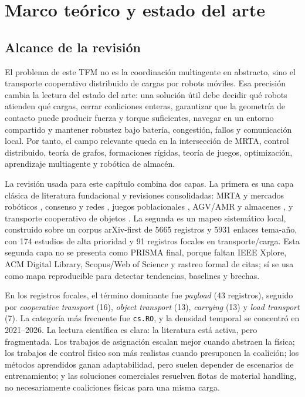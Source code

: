 \section{Marco teórico y estado del arte}

\subsection{Alcance de la revisión}

El problema de este TFM no es la coordinación multiagente en abstracto, sino el
transporte cooperativo distribuido de cargas por robots móviles. Esa precisión cambia la
lectura del estado del arte: una solución útil debe decidir qué robots atienden qué
cargas, cerrar coaliciones enteras, garantizar que la geometría de contacto puede
producir fuerza y torque suficientes, navegar en un entorno compartido y mantener
robustez bajo batería, congestión, fallos y comunicación local. Por tanto, el campo
relevante queda en la intersección de MRTA, control distribuido, teoría de grafos,
formaciones rígidas, teoría de juegos, optimización, aprendizaje multiagente y robótica
de almacén.

La revisión usada para este capítulo combina dos capas. La primera es una capa clásica
de literatura fundacional y revisiones consolidadas: MRTA y mercados robóticos
\citep{gerkey2004formal,dias2006market,korsah2013taxonomy}, consenso y redes
\citep{olfati2004consensus,olfati2007consensus,ren2008distributed,bullo2009distributed},
juegos poblacionales \citep{sandholm2010population,quijano2017population}, AGV/AMR y
almacenes \citep{leanh2006agv,wurman2008coordinating,azadeh2019warehouse}, y transporte
cooperativo de objetos \citep{tuci2018cooperative,farivarnejad2022multirobot,an2023cooperative}.
La segunda es un mapeo sistemático local, construido sobre un corpus arXiv-first de
5665 registros y 5931 enlaces tema-año, con 174 estudios de alta prioridad y 91 registros
focales en transporte/carga. Esta segunda capa no se presenta como PRISMA final, porque
faltan IEEE Xplore, ACM Digital Library, Scopus/Web of Science y rastreo formal de citas;
sí se usa como mapa reproducible para detectar tendencias, baselines y brechas.

En los registros focales, el término dominante fue \emph{payload} (43 registros), seguido
por \emph{cooperative transport} (16), \emph{object transport} (13), \emph{carrying} (13)
y \emph{load transport} (7). La categoría más frecuente fue \texttt{cs.RO}, y la densidad
temporal se concentró en 2021--2026. La lectura científica es clara: la literatura está
activa, pero fragmentada. Los trabajos de asignación escalan mejor cuando abstraen la
física; los trabajos de control físico son más realistas cuando presuponen la coalición;
los métodos aprendidos ganan adaptabilidad, pero suelen depender de escenarios de
entrenamiento; y las soluciones comerciales resuelven flotas de material handling, no
necesariamente coaliciones físicas para una misma carga.

